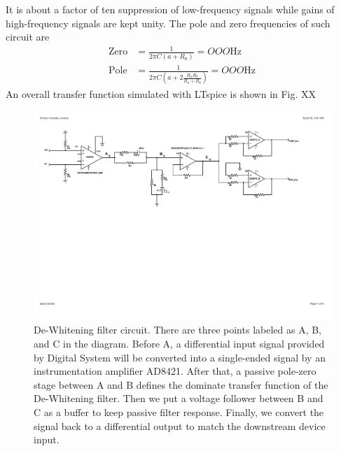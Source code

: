 It is about a factor of ten suppression of low-frequency signals while gains of high-frequency signals are kept unity.
The pole and zero frequencies of such circuit are
\begin{align}
    \mathrm{Zero} &= \frac{1}{2 \pi C (a+R_a)} = OOO \mathrm{Hz} \\
    \mathrm{Pole} &= \frac{1}{2 \pi C (a+2\frac{R_a R_b}{R_a+R_b})} = OOO \mathrm{Hz}
\end{align}
 An overall transfer function simulated with LTspice is shown in Fig. XX 

\begin{figure}
\includegraphics[width=1\textwidth]{figure/DEWcircuit.pdf}
\caption[De-Whitening filter circuit]{De-Whitening filter circuit. There are three points labeled as A, B, and C in the diagram. Before A, a differential input signal provided by Digital System will be converted into a single-ended signal by an instrumentation amplifier AD8421. After that, a passive pole-zero stage between A and B defines the dominate transfer function of the De-Whitening filter. Then we put a voltage follower between B and C as a buffer to keep passive filter response. Finally, we convert the signal back to a differential output to match the downstream device input. }\label{fig:dewcircuit}
\end{figure}


